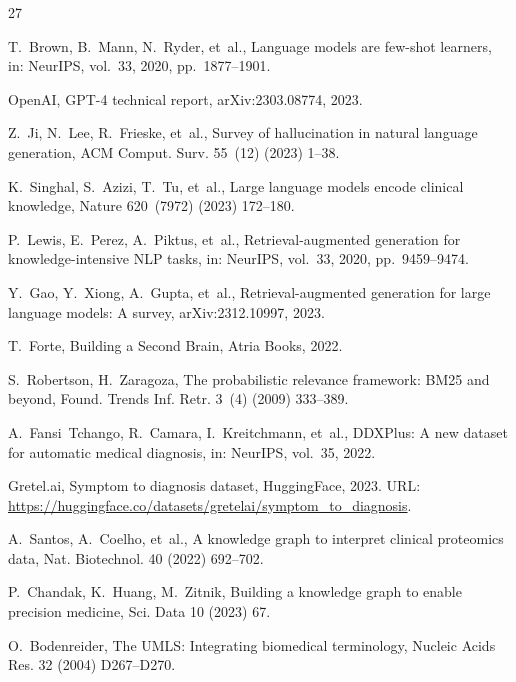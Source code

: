 \documentclass[preprint,12pt]{elsarticle}
\begin{document}


\begin{thebibliography}{27}

T.~Brown, B.~Mann, N.~Ryder, et~al., Language models are few-shot learners, in: NeurIPS, vol.~33, 2020, pp.~1877--1901.

OpenAI, GPT-4 technical report, arXiv:2303.08774, 2023.

Z.~Ji, N.~Lee, R.~Frieske, et~al., Survey of hallucination in natural language generation, ACM Comput. Surv. 55~(12) (2023) 1--38.

K.~Singhal, S.~Azizi, T.~Tu, et~al., Large language models encode clinical knowledge, Nature 620~(7972) (2023) 172--180.

P.~Lewis, E.~Perez, A.~Piktus, et~al., Retrieval-augmented generation for knowledge-intensive NLP tasks, in: NeurIPS, vol.~33, 2020, pp.~9459--9474.

Y.~Gao, Y.~Xiong, A.~Gupta, et~al., Retrieval-augmented generation for large language models: A survey, arXiv:2312.10997, 2023.

T.~Forte, Building a Second Brain, Atria Books, 2022.

S.~Robertson, H.~Zaragoza, The probabilistic relevance framework: BM25 and beyond, Found. Trends Inf. Retr. 3~(4) (2009) 333--389.

A.~Fansi~Tchango, R.~Camara, I.~Kreitchmann, et~al., DDXPlus: A new dataset for automatic medical diagnosis, in: NeurIPS, vol.~35, 2022.

Gretel.ai, Symptom to diagnosis dataset, HuggingFace, 2023. URL: \url{https://huggingface.co/datasets/gretelai/symptom_to_diagnosis}.

A.~Santos, A.~Coelho, et~al., A knowledge graph to interpret clinical proteomics data, Nat. Biotechnol. 40 (2022) 692--702.

P.~Chandak, K.~Huang, M.~Zitnik, Building a knowledge graph to enable precision medicine, Sci. Data 10 (2023) 67.

O.~Bodenreider, The UMLS: Integrating biomedical terminology, Nucleic Acids Res. 32 (2004) D267--D270.


\end{thebibliography}
\end{document}
